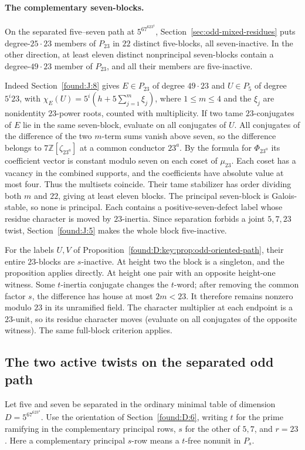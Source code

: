\documentclass[11pt,a4paper]{article}
\numberwithin{equation}{section}
\theoremstyle{remark}
\begin{document}
\paragraph{The complementary seven-blocks.}
On the separated five--seven path at $5^67^623^4$, Section~\ref{sec:odd-mixed-residues}
puts degree-$25\cdot23$ members of $P_{23}$ in $22$ distinct
five-blocks, all seven-inactive. In the other direction, at least
eleven distinct nonprincipal seven-blocks contain a degree-$49\cdot23$
member of $P_{23}$, and all their members are five-inactive.

Indeed Section~\ref{found:J:8} gives $E\in P_{23}$ of degree $49\cdot23$
and $U\in P_5$ of degree $5^i23$, with
$\chi_E(U)=5^i(h+5\sum_{j=1}^{m}\xi_j)$, where $1\le m\le4$ and
the $\xi_j$ are nonidentity $23$-power roots, counted with
multiplicity. If two tame $23$-conjugates of $E$ lie in the same
seven-block, evaluate on all conjugates of $U$. All conjugates of
the difference of the two $m$-term sums vanish above seven, so the
difference belongs to $7\mathbb Z[\zeta_{23^a}]$ at a common
conductor $23^a$. By the formula for $\Phi_{23^a}$ its coefficient
vector is constant modulo seven on each coset of $\mu_{23}$.
Each coset has a vacancy in the combined supports, and the
coefficients have absolute value at most four. Thus the multisets
coincide. Their tame stabilizer has order dividing both $m$ and
$22$, giving at least eleven blocks. The principal seven-block
is Galois-stable, so none is principal. Each contains a
positive-seven-defect label whose residue character is moved by
$23$-inertia. Since separation forbids a joint $5,7,23$ twist,
Section~\ref{found:J:5} makes the whole block five-inactive.

For the labels $U,V$ of Proposition~\ref{found:D:key:prop:odd-oriented-path},
their entire $23$-blocks are $s$-inactive. At height two the block
is a singleton, and the proposition applies directly. At height
one pair with an opposite height-one witness. Some $t$-inertia
conjugate changes the $t$-word; after removing the common factor
$s$, the difference has house at most $2m<23$. It therefore remains
nonzero modulo $23$ in its unramified field. The character multiplier
at each endpoint is a $23$-unit, so its residue character moves
(evaluate on all conjugates of the opposite witness). The same
full-block criterion applies.

\subsection{The two active twists on the separated odd path}\label{found:T:10}
\label{found:T:key:sec:odd-joint}
Let five and seven be separated in the ordinary minimal table of
dimension $D=5^67^623^4$. Use the orientation of Section~\ref{found:D:6},
writing $t$ for the prime ramifying in the complementary principal
rows, $s$ for the other of $5,7$, and $r=23$. Here a complementary
principal $s$-row means a $t$-free nonunit in $P_s$.
\end{document}
